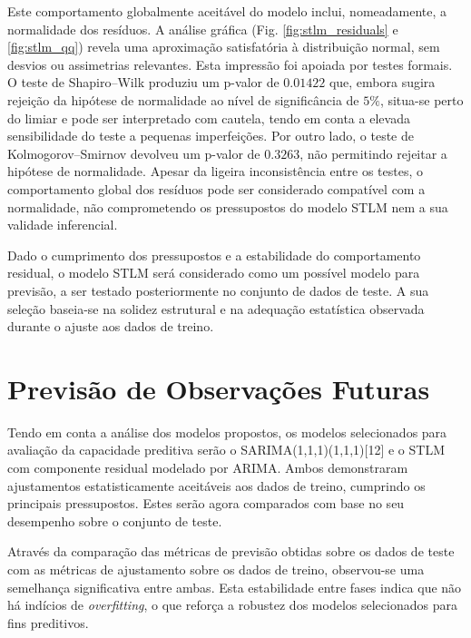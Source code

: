 \documentclass[journal]{IEEEtran}
\begin{document}
Este comportamento globalmente aceitável do modelo inclui, nomeadamente, a normalidade dos resíduos. A análise gráfica (Fig. \ref{fig:stlm_residuals} e \ref{fig:stlm_qq}) revela uma aproximação satisfatória à distribuição normal, sem desvios ou assimetrias relevantes. Esta impressão foi apoiada por testes formais. O teste de Shapiro–Wilk produziu um p-valor de $0.01422$ que, embora sugira rejeição da hipótese de normalidade ao nível de significância de $5\%$, situa-se perto do limiar e pode ser interpretado com cautela, tendo em conta a elevada sensibilidade do teste a pequenas imperfeições. Por outro lado, o teste de Kolmogorov–Smirnov devolveu um p-valor de $0.3263$, não permitindo rejeitar a hipótese de normalidade. Apesar da ligeira inconsistência entre os testes, o comportamento global dos resíduos pode ser considerado compatível com a normalidade, não comprometendo os pressupostos do modelo STLM nem a sua validade inferencial.

Dado o cumprimento dos pressupostos e a estabilidade do comportamento residual, o modelo STLM será considerado como um possível modelo para previsão, a ser testado posteriormente no conjunto de dados de teste. A sua seleção baseia-se na solidez estrutural e na adequação estatística observada durante o ajuste aos dados de treino.

\section{Previsão de Observações Futuras}

Tendo em conta a análise dos modelos propostos, os modelos selecionados para avaliação da capacidade preditiva serão o SARIMA(1,1,1)(1,1,1)[12] e o STLM com componente residual modelado por ARIMA. Ambos demonstraram ajustamentos estatisticamente aceitáveis aos dados de treino, cumprindo os principais pressupostos. Estes serão agora comparados com base no seu desempenho sobre o conjunto de teste.

Através da comparação das métricas de previsão obtidas sobre os dados de teste com as métricas de ajustamento sobre os dados de treino, observou-se uma semelhança significativa entre ambas. Esta estabilidade entre fases indica que não há indícios de \textit{overfitting}, o que reforça a robustez dos modelos selecionados para fins preditivos.
\end{document}
